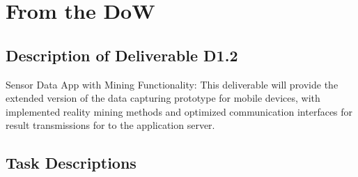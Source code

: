 \documentclass[external]{20120615_deliverable_template_ukob}
\theoremstyle{definition}
\begin{document}
\section{From the DoW}
\subsection{Description of Deliverable D1.2}
Sensor Data App with Mining Functionality: This deliverable will provide the
extended version of the data capturing prototype for mobile devices, with
implemented reality mining methods and optimized communication interfaces for
result transmissions for to the application server.

\subsection{Task Descriptions}
\end{document}
